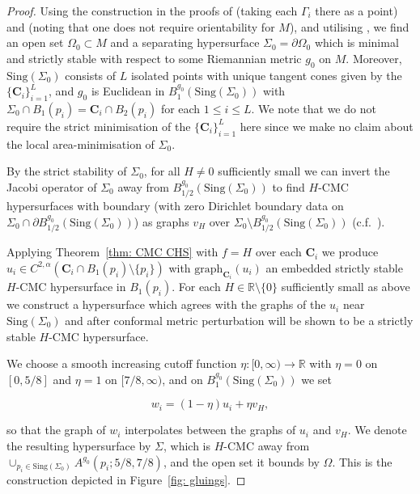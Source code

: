 \documentclass[12pt]{article}
\begin{document}
\begin{proof}
    Using the construction in the proofs of \cite[Theorem 3]{MN26} (taking each $\Gamma_i$ there as a point) and \cite[Theorem 1]{S00} (noting that one does not require orientability for $M$), and utilising \cite[Proposition 2]{S00}, we find an open set $\Omega_0 \subset M$ and a separating hypersurface $\Sigma_0 = \partial \Omega_0$ which is minimal and strictly stable with respect to some Riemannian metric $g_0$ on $M$. Moreover, $\mathrm{Sing}(\Sigma_0)$ consists of $L$ isolated points with unique tangent cones given by the $\{\mathbf{C}_i\}_{i = 1}^L$, and $g_0$ is Euclidean in $B_1^{g_0}(\mathrm{Sing}(\Sigma_0))$ with $\Sigma_0 \cap B_1(p_i) = \mathbf{C}_i \cap B_2(p_i)$ for each $1 \leq i \leq L$. We note that we do not require the strict minimisation of the $\{\mathbf{C}_i\}_{i = 1}^L$ here since we make no claim about the local area-minimisation of $\Sigma_0$.
    
    \bigskip
    
    By the strict stability of $\Sigma_0$, for all $H \neq 0$ sufficiently small we can invert the Jacobi operator of $\Sigma_0$ away from $B_{1/2}^{g_0}(\mathrm{Sing}(\Sigma_0))$ to find $H$-CMC hypersurfaces with boundary (with zero Dirichlet boundary data on $\Sigma_0 \cap \partial B_{1/2}^{g_0}(\mathrm{Sing}(\Sigma_0))$) as graphs $v_H$ over $\Sigma_0 \setminus B_{1/2}^{g_0}(\mathrm{Sing}(\Sigma_0))$ (c.f.~\cite[Remark 4]{MN26}). 
    
    \bigskip
    
    Applying Theorem~\ref{thm: CMC CHS} with $f = H$ over each $\mathbf{C}_i$ we produce $u_i \in C^{2,\alpha}(\mathbf{C}_i \cap B_1(p_i) \setminus \{p_i\})$ with $\mathrm{graph}_{\mathbf{C}_i}(u_i)$ an embedded strictly stable $H$-CMC hypersurface in $B_1(p_i)$. For each $H \in \mathbb{R} \setminus \{0\}$ sufficiently small as above we construct a hypersurface which agrees with the graphs of the $u_i$ near $\mathrm{Sing}(\Sigma_0)$ and after conformal metric perturbation will be shown to be a strictly stable $H$-CMC hypersurface. 

    \bigskip

    We choose a smooth increasing cutoff function $\eta: [0,\infty) \rightarrow \mathbb{R}$ with $\eta = 0$ on $[0,5/8]$ and $\eta = 1$ on $[7/8,\infty)$, and on $B_1^{g_0}(\mathrm{Sing}(\Sigma_0))$ we set
    
    $$w_i = (1-\eta)u_i + \eta v_H,$$

    so that the graph of $w_i$ interpolates between the graphs of $u_i$ and $v_H$. We denote the resulting hypersurface by $\Sigma$, which is $H$-CMC away from $\cup_{p_i \in \mathrm{Sing}(\Sigma_0)}A^{g_0}(p_i; 5/8,7/8)$, and the open set it bounds by $\Omega$. This is the construction depicted in Figure~\ref{fig: gluings}.


\end{proof}
\end{document}
